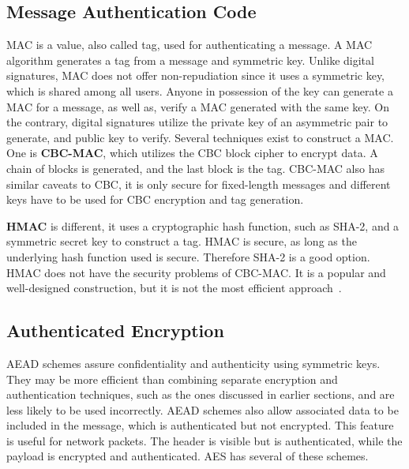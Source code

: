 \subsection{Message Authentication Code}\label{chap:background:crypto:mac}

\ac{MAC} is a value, also called tag, used for authenticating a message.
A \ac{MAC} algorithm generates a tag from a message and symmetric key. Unlike digital signatures, \ac{MAC} does not offer non-repudiation since it uses a symmetric key, which is shared among all users. Anyone in possession of the key can generate a \ac{MAC} for a message, as well as, verify a MAC generated with the same key. On the contrary, digital signatures utilize the private key of an asymmetric pair to generate, and public key to verify.
Several techniques exist to construct a \ac{MAC}. One is \textbf{\ac{CBC-MAC}}, which utilizes the \ac{CBC} block cipher to encrypt data. A chain of blocks is generated, and the last block is the tag.
\ac{CBC-MAC} also has similar caveats to \ac{CBC}, it is only secure for fixed-length messages \cite{aesmodes} and different keys have to be used for \ac{CBC} encryption and tag generation.

\textbf{\ac{HMAC}} is different, it uses a cryptographic hash function, such as SHA-2, and a symmetric secret key to construct a tag. \ac{HMAC} is secure, as long as the underlying hash function used is secure. Therefore SHA-2 is a good option.
\ac{HMAC} does not have the security problems of \ac{CBC-MAC}. It is a popular and well-designed construction, but it is not the most efficient approach~\cite{aesmodes}.

\subsection{Authenticated Encryption}\label{chap:background:crypto:aead}

\ac{AEAD} schemes assure confidentiality and authenticity using symmetric keys. They may be more efficient than combining separate encryption and authentication techniques, such as the ones discussed in earlier sections, and are less likely to be used incorrectly. \ac{AEAD} schemes also allow associated data to be included in the message, which is authenticated but not encrypted. This feature is useful for network packets. The header is visible but is authenticated, while the payload is encrypted and authenticated. 
\ac{AES} has several of these schemes. 

